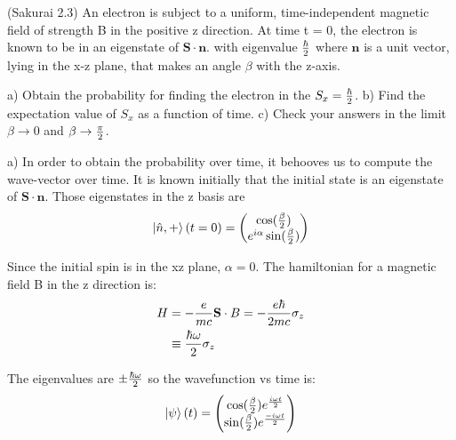 \documentclass[10pt]{scrartcl}
\begin{document}
\newpage
\begin{myquestion}
	(Sakurai 2.3) An electron is subject to a uniform, time-independent magnetic field of strength B in the positive z direction.  At time t = 0, the electron  is known to be in an eigenstate of $\mathbf{S} \cdot \mathbf{n}$.  with eigenvalue ${\hbar \over 2}$ where $\mathbf{n}$ is a unit vector, lying in the x-z plane, that makes an angle $\beta$ with the z-axis.
	
	a) Obtain the probability for finding the electron in the $S_x = {\hbar \over 2}$.
	b) Find the expectation value of $S_x$ as a function of time.
	c) Check your answers in the limit $\beta \rightarrow 0$ and $\beta \rightarrow {\pi \over 2}$.
	\end{myquestion}

a)  In order to obtain the probability over time, it behooves us to compute the wave-vector over time.  It is known initially that the initial state is an eigenstate of $\mathbf{S} \cdot \mathbf{n}$.  Those eigenstates in the z basis are
\begin{align}
	\ket{\hat{n}, +} (t = 0) = \begin{pmatrix}
		\cos({\beta \over 2}) \\
		e^{i \alpha} \sin({\beta \over 2})
	\end{pmatrix}
	\end{align}

Since the initial spin is in the xz plane, $\alpha = 0$.  The hamiltonian for a magnetic field B in the z direction is:
\begin{align}
	H & = - {e \over mc} \mathbf{S} \cdot B = - {e \hbar \over 2mc} 
	 \sigma_z \\
	 & \equiv {\hbar \omega \over 2} \sigma_z 
	\end{align}

The eigenvalues are $\pm {\hbar \omega \over 2}$ so the wavefunction vs time is:
\begin{align}
	\ket{\psi} (t) = \begin{pmatrix}
		\cos({\beta \over 2}) e^{i \omega t \over 2} \\
		\sin({\beta \over 2}) e^{-i \omega t \over 2}
	\end{pmatrix}
	\end{align}
\end{document}
